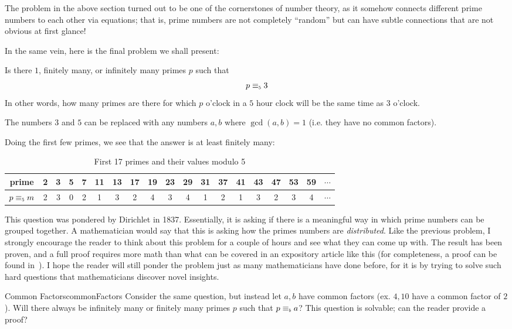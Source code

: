 \documentclass{article}
\newcommand\scalemath[2]{\scalebox{#1}{\mbox{\ensuremath{\displaystyle #2}}}}
\newcommand{\Equiv}[1]{\equiv_{\scalemath{0.6}{#1}}}
\newcommand{\qn}{\quad\newline}
\begin{document}
The problem in the above section turned out to be one of the cornerstones of number theory, as it
somehow connects different prime numbers to each other via equations; that is, prime numbers are not
completely ``random'' but can have subtle connections that are not obvious at first glance!

In the same vein, here is the final problem we shall present:
\begin{titledBox*}{}
    Is there $1$, finitely many, or infinitely many primes $p$ such that
  \[
    p\Equiv{5}3
  \]
  In other words, how many primes are there for which $p$ o'clock
  in a $5$ hour clock will be the same time as $3$ o'clock.

  \qn
  The numbers $3$ and $5$ can be replaced with any numbers $a,b$ where $\gcd(a,b) = 1$ (i.e. they have no common
  factors).
\end{titledBox*}

Doing the first few primes, we see that the answer is at least finitely many:
\begin{table}[H]
\centering
\begin{tabular}{|c|c|c|c|c|c|c|c|c|c|c|c|c|c|c|c|c|c|c|}
\hline
prime & 2 & \cellcolor{green!20}3 & 5 & 7 & 11 & \cellcolor{green!20}13 & 17 & 19 & \cellcolor{green!20}23
      & 29 & 31 & 37 & 41 & \cellcolor{green!20}43 & 47&\cellcolor{green!20} 53 & 59 &$\cdots$ \\
\hline
$p\Equiv{5}m$&2 & \cellcolor{green!20}3 & 0 & 2 & 1 & \cellcolor{green!20}3 & 2 & 4 & \cellcolor{green!20}3
             & 4 & 1 & 2 & 1 & \cellcolor{green!20}3 & 2 & \cellcolor{green!20} 3 & 4 &$\cdots$\\
\hline
\end{tabular}
\caption{First 17 primes and their values modulo 5}
\end{table}


This question was pondered by Dirichlet in 1837. Essentially, it is asking if there is a meaningful way in
which prime numbers can be grouped together. A mathematician would say that this is asking how the primes
numbers are \emph{distributed}. Like the previous problem, I strongly encourage the reader to think about
this problem for a couple of hours and see what they can come up with. The result has been proven, and a
full proof requires more math than what can be covered in an expository article like this (for completeness, a
proof can be found in~\cite[chapter~3.4]{NateCFT}). I hope the reader will still ponder the problem just as
many mathematicians have done before, for it is by trying to solve such hard questions that mathematicians
discover novel insights.


\begin{exercise}{Common Factors}{commonFactors}
  Consider the same question, but instead let $a,b$ have common factors (ex. $4,10$ have a common factor of
  $2$). Will there always be infinitely many
  or finitely many primes $p$ such that $p\Equiv{b}a$? This question is solvable; can the reader provide
  a proof?
\end{exercise}

\newpage
\printbibliography %
\end{document}
